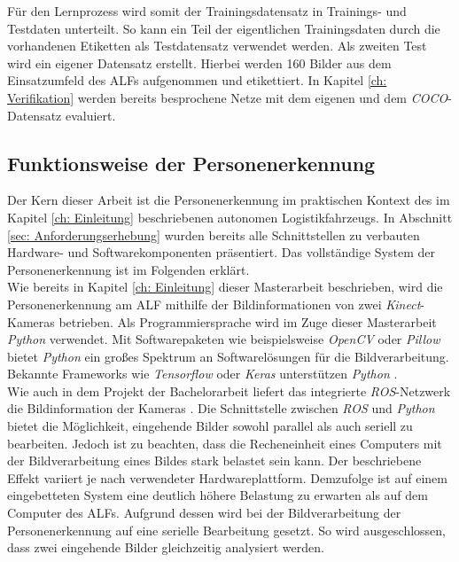 		Für den Lernprozess wird somit der Trainingsdatensatz in Trainings- und Testdaten unterteilt. So kann ein Teil der eigentlichen Trainingsdaten durch die vorhandenen Etiketten als Testdatensatz verwendet werden. Als zweiten Test wird ein eigener Datensatz erstellt. Hierbei werden 160 Bilder aus dem Einsatzumfeld des ALFs aufgenommen und etikettiert. In Kapitel \ref{ch: Verifikation} werden bereits besprochene Netze mit dem eigenen und dem \textit{COCO}-Datensatz evaluiert.
	
		
	\subsection{Funktionsweise der Personenerkennung}
	\label{sec: Funktionsweise des Gesamtsystems}
	
	Der Kern dieser Arbeit ist die Personenerkennung im praktischen Kontext des im Kapitel \ref{ch: Einleitung} beschriebenen autonomen Logistikfahrzeugs. In Abschnitt \ref{sec: Anforderungserhebung} wurden bereits alle Schnittstellen zu verbauten Hardware- und Softwarekomponenten präsentiert. Das vollständige System der Personenerkennung ist im Folgenden erklärt.\\
	
	Wie bereits in Kapitel \ref{ch: Einleitung} dieser Masterarbeit beschrieben, wird die Personenerkennung am ALF mithilfe der Bildinformationen von zwei \textit{Kinect}-Kameras betrieben. Als Programmiersprache wird im Zuge dieser Masterarbeit \textit{Python} verwendet. Mit Softwarepaketen wie beispielsweise \textit{OpenCV} oder \textit{Pillow} bietet \textit{Python} ein großes Spektrum an Softwarelösungen für die Bildverarbeitung. Bekannte Frameworks wie \textit{Tensorflow} oder \textit{Keras} unterstützen \textit{Python} \cite{tensorflow, keraspython}.\\
	
	Wie auch in dem Projekt der Bachelorarbeit liefert das integrierte \textit{ROS}-Netzwerk die Bildinformation der Kameras \cite{Bachelorarbeit}. Die Schnittstelle zwischen \textit{ROS} und \textit{Python} bietet die Möglichkeit, eingehende Bilder sowohl parallel als auch seriell zu bearbeiten. Jedoch ist zu beachten, dass die Recheneinheit eines Computers mit der Bildverarbeitung eines Bildes stark belastet sein kann. Der beschriebene Effekt variiert je nach verwendeter Hardwareplattform. Demzufolge ist auf einem eingebetteten System eine deutlich höhere Belastung zu erwarten als auf dem Computer des ALFs. Aufgrund dessen wird bei der Bildverarbeitung der Personenerkennung auf eine serielle Bearbeitung gesetzt. So wird ausgeschlossen, dass zwei eingehende Bilder gleichzeitig analysiert werden.\\
	

